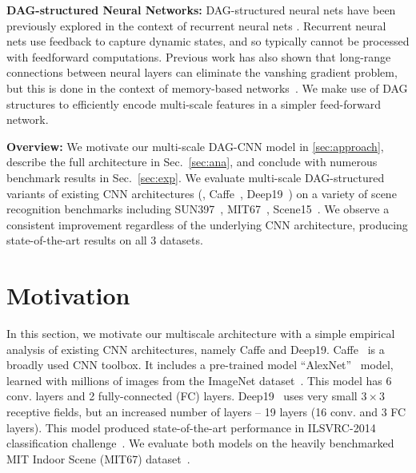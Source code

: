 \documentclass[10pt,twocolumn,letterpaper]{article}
\begin{document}
{\bf DAG-structured Neural Networks:} DAG-structured neural nets have been previously explored in the context of recurrent neural nets \cite{baldi2003principled,graves2009offline}. Recurrent neural nets use feedback to capture dynamic states, and so typically cannot be processed with feedforward computations. Previous work has also shown that long-range connections between neural layers can eliminate the vanshing gradient problem, but this is done in the context of memory-based networks~\cite{hochreiter1997long}. We make use of DAG structures to efficiently encode multi-scale features in a simpler feed-forward network.

{\bf Overview:} We motivate our multi-scale DAG-CNN model in \ref{sec:approach}, describe the full architecture in Sec.~\ref{sec:ana}, and conclude with numerous benchmark results in Sec.~\ref{sec:exp}. We evaluate multi-scale DAG-structured variants of existing CNN architectures (\eg, Caffe~\cite{Caffe}, Deep19~\cite{veryDeep}) on a variety of scene recognition benchmarks including SUN397~\cite{SUN397}, MIT67~\cite{MIT67}, Scene15~\cite{Scene15}. We observe a consistent improvement regardless of the underlying CNN architecture, producing state-of-the-art results on all 3 datasets.



\section{Motivation\label{sec:approach}}
In this section, we motivate our multiscale architecture with a simple empirical analysis of existing CNN architectures, 
namely Caffe and Deep19. Caffe~\cite{Caffe} is a broadly used CNN toolbox. It includes a pre-trained model ``AlexNet''~\cite{AlexNet} model, learned with millions of images from the ImageNet dataset~\cite{ImageNet}. This model has 6 conv. layers and 2 fully-connected (FC) layers. Deep19~\cite{veryDeep} uses very small $3\times 3$ receptive fields, but an increased number of layers -- 19 layers (16 conv. and 3 FC layers). This model produced state-of-the-art performance in ILSVRC-2014 classification challenge~\cite{ILSVRC14}. 
We evaluate both models on the heavily benchmarked MIT Indoor Scene (MIT67) dataset~\cite{MIT67}.
\end{document}
